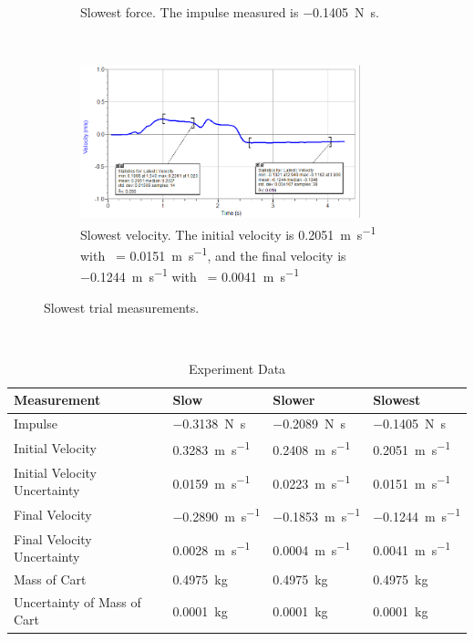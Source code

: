 \documentclass[12pt]{article}
\newcommand{\mps}[1]{\SI{#1}{\meter\per\second}}
\newcommand{\impls}[1]{\SI{#1}{\newton\second}}
\newcommand{\kg}[1]{\SI{#1}{\kilo\gram}}
\begin{document}
\begin{enumerate}
\begin{figure}[H]
\begin{subfigure}[t]{0.5\textwidth}
                \caption{Slowest force. The impulse measured is \impls{-0.1405}.}
            \end{subfigure}%
            ~
            \begin{subfigure}[t]{0.5\textwidth}
                \centering
                \includegraphics[width=3.2in]{slowest_velo}
                \caption{Slowest velocity. The initial velocity is \mps{0.2051} with \textsigma\ = \mps{0.0151}, and the final velocity is \mps{-.1244} with \textsigma\ = \mps{0.0041}}
            \end{subfigure}
            \caption{Slowest trial measurements.}
        \end{figure}
        ~
        \begin{table}[H]
            \centering
            \caption{Experiment Data}
            \label{tab:1}
            \begin{tabular}{@{} llll @{}}
                \toprule
                Measurement                     &{Slow}             &{Slower}           &{Slowest}\\ \midrule
                Impulse                         &\impls{-0.3138}    &\impls{-0.2089}    &\impls{-0.1405}\\[.4em]
                Initial Velocity                &\mps{0.3283}       &\mps{0.2408}       &\mps{0.2051}\\[.4em]
                Initial Velocity Uncertainty    &\mps{0.0159}       &\mps{0.0223}       &\mps{0.0151}\\[.4em]
                Final Velocity                  &\mps{-0.2890}      &\mps{-0.1853}      &\mps{-0.1244}\\[.4em]
                Final Velocity Uncertainty      &\mps{0.0028}       &\mps{0.0004}       &\mps{.0041}\\[.4em]
                Mass of Cart                    &\kg{0.4975}        &\kg{0.4975}        &\kg{0.4975}\\[.4em]
                Uncertainty of Mass of Cart     &\kg{0.0001}        &\kg{0.0001}        &\kg{0.0001}\\[.4em]

\end{tabular}
\end{table}
\end{enumerate}
\end{document}
